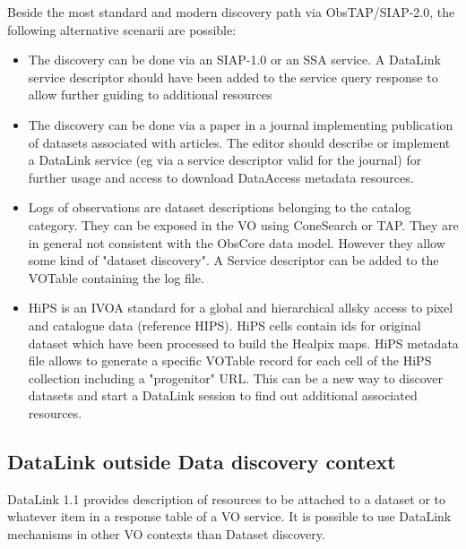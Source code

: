 \documentclass[11pt,a4paper]{ivoa}
\begin{document}
Beside the most standard and modern discovery path via ObsTAP/SIAP-2.0, the following 
alternative scenarii are possible: 
\begin{itemize}
\item The discovery can be done via an SIAP-1.0 or an SSA service. A DataLink service 
descriptor should have been added to the service query response to allow further guiding 
to additional resources 
\item The discovery can be done via a paper in a journal implementing  publication of 
datasets associated with articles. The editor should describe or implement a DataLink 
service (eg via a service descriptor valid for the journal) for further usage and access
to download DataAccess metadata resources. 
\item  Logs of observations are dataset descriptions belonging to the catalog category. 
They can be exposed in the VO using ConeSearch or TAP. They are in general not consistent
with the ObsCore data model. However they allow some kind of "dataset discovery". A Service
descriptor can be added to the VOTable containing the log file. 
\item HiPS  is an IVOA standard for a global and hierarchical allsky access to pixel and
catalogue data (reference HIPS). HiPS cells contain ids for original dataset which have 
been processed to build the Healpix maps. HiPS metadata file allows to generate a specific
VOTable record for each cell of the HiPS collection including a "progenitor" URL. This can
be a new way to discover datasets and start a DataLink session to find out additional 
associated resources.   
\end{itemize}

\subsection{DataLink outside Data discovery context}

DataLink 1.1 provides description of resources to be attached to a dataset or to whatever 
item in a response table of a VO service. It is possible to use DataLink mechanisms in other
VO contexts than Dataset discovery.
\end{document}
